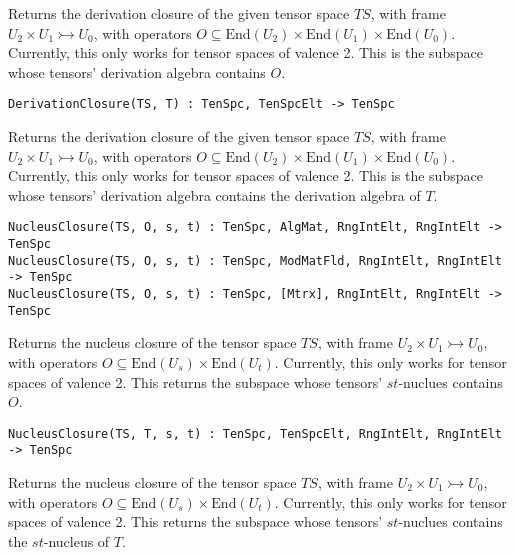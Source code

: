 Returns the derivation closure of the given tensor space $TS$, with frame $U_2\times U_1\rightarrowtail U_0$, with operators $O\subseteq \text{End}(U_2)\times \text{End}(U_1)\times \text{End}(U_0)$.
Currently, this only works for tensor spaces of valence 2.
This is the subspace whose tensors' derivation algebra contains $O$.

\color{blue}
{\small \begin{verbatim}
DerivationClosure(TS, T) : TenSpc, TenSpcElt -> TenSpc
\end{verbatim} }
\color{black}

Returns the derivation closure of the given tensor space $TS$, with frame $U_2\times U_1\rightarrowtail U_0$, with operators $O\subseteq \text{End}(U_2)\times \text{End}(U_1)\times \text{End}(U_0)$.
Currently, this only works for tensor spaces of valence 2.
This is the subspace whose tensors' derivation algebra contains the derivation algebra of $T$.

\color{blue}
{\small \begin{verbatim}
NucleusClosure(TS, O, s, t) : TenSpc, AlgMat, RngIntElt, RngIntElt -> TenSpc
NucleusClosure(TS, O, s, t) : TenSpc, ModMatFld, RngIntElt, RngIntElt -> TenSpc
NucleusClosure(TS, O, s, t) : TenSpc, [Mtrx], RngIntElt, RngIntElt -> TenSpc
\end{verbatim} }
\color{black}

Returns the nucleus closure of the tensor space $TS$, with frame $U_2\times U_1\rightarrowtail U_0$, with operators $O\subseteq \text{End}(U_s)\times \text{End}(U_t)$.
Currently, this only works for tensor spaces of valence 2.
This returns the subspace whose tensors' $st$-nuclues contains $O$.

\color{blue}
{\small \begin{verbatim}
NucleusClosure(TS, T, s, t) : TenSpc, TenSpcElt, RngIntElt, RngIntElt -> TenSpc
\end{verbatim} }
\color{black}

Returns the nucleus closure of the tensor space $TS$, with frame $U_2\times U_1\rightarrowtail U_0$, with operators $O\subseteq \text{End}(U_s)\times \text{End}(U_t)$.
Currently, this only works for tensor spaces of valence 2.
This returns the subspace whose tensors' $st$-nuclues contains the $st$-nucleus of $T$.

